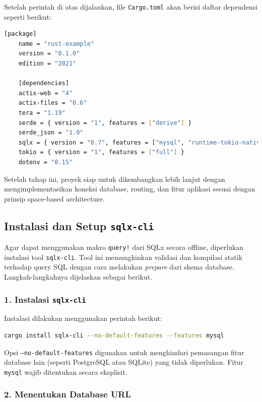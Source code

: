 Setelah perintah di atas dijalankan, file \texttt{Cargo.toml} akan berisi daftar dependensi seperti berikut:

\begin{lstlisting}[language=bash, basicstyle=\footnotesize\ttfamily, caption={Isi Cargo.toml setelah penambahan dependensi}, label={lst:cargo-toml}]
	[package]
	name = "rust-example"
	version = "0.1.0"
	edition = "2021"
	
	[dependencies]
	actix-web = "4"
	actix-files = "0.6"
	tera = "1.19"
	serde = { version = "1", features = ["derive"] }
	serde_json = "1.0"
	sqlx = { version = "0.7", features = ["mysql", "runtime-tokio-native-tls"] }
	tokio = { version = "1", features = ["full"] }
	dotenv = "0.15"
\end{lstlisting}

Setelah tahap ini, proyek siap untuk dikembangkan lebih lanjut dengan mengimplementasikan koneksi database, routing, dan fitur aplikasi sesuai dengan prinsip space-based architecture.


\subsection{Instalasi dan Setup \texttt{sqlx-cli}}

Agar dapat menggunakan makro \texttt{query!} dari SQLx secara offline, diperlukan instalasi tool \texttt{sqlx-cli}. Tool ini memungkinkan validasi dan kompilasi statik terhadap query SQL dengan cara melakukan \textit{prepare} dari skema database. Langkah-langkahnya dijelaskan sebagai berikut.

\subsubsection*{1. Instalasi \texttt{sqlx-cli}}

Instalasi dilakukan menggunakan perintah berikut:

\begin{lstlisting}[language=bash, basicstyle=\footnotesize\ttfamily, caption={Menginstal sqlx-cli untuk MySQL}, label={lst:install-sqlx-cli}]
	cargo install sqlx-cli --no-default-features --features mysql
\end{lstlisting}

Opsi \texttt{--no-default-features} digunakan untuk menghindari pemasangan fitur database lain (seperti PostgreSQL atau SQLite) yang tidak diperlukan. Fitur \texttt{mysql} wajib ditentukan secara eksplisit.

\subsubsection*{2. Menentukan Database URL}

